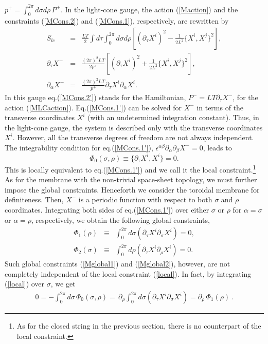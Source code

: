 \documentclass[12pt,a4paper]{article}
\newcommand{\ptau}{\partial_\tau}
\newcommand{\psig}{\partial_\sigma}
\newcommand{\prho}{\partial_\rho}
\newcommand{\p}{\partial}
\begin{document}
$p^{+}=\int_0^{2\pi}d\sigma d\rho\,P^{+}$.
In the light-cone gauge, the action (\ref{Maction}) and the constraints
(\ref{MCons.2}) and (\ref{MCons.1}), respectively, are rewritten by
\begin{eqnarray}
  S_{lc}&=&\frac{LT}{2}\int d\tau\int_0^{2\pi}d\sigma d\rho\left[
	(\ptau X^i)^2-\frac{1}{2L^2}\{X^{i},X^{j}\}^2\right]
	\label{MLCaction},\\
  \ptau X^{-}&=&\frac{(2\pi)^2 LT}{2p^+}\left[(\ptau X^i)^2
	+ \frac{1}{2L^2}\{X^{i},X^{j}\}^2\right]\label{MCons.2'},\\
  \p_{\alpha}X^{-}&=&\frac{(2\pi)^2 LT}{p^+} \ptau X^i\p_{\alpha}
	X^i\label{MCons.1'}.
\end{eqnarray}
In this gauge eq.(\ref{MCons.2'}) stands for the Hamiltonian,
$P^-=LT\ptau X^-$, for the action (\ref{MLCaction}).
Eq.(\ref{MCons.1'}) can be solved for $X^-$ in terms of the transverse
coordinates $X^i$ (with an undetermined integration constant). Thus,
in the light-cone gauge, the system is described only with the
transverse coordinates $X^i$. However, all the transverse degrees of
freedom are not always independent.
The integrability condition for eq.(\ref{MCons.1'}),
$\epsilon^{\alpha\beta}\p_\alpha\p_\beta X^-=0$, leads to
\begin{equation}
  \Phi_0(\sigma,\rho)\equiv\{\ptau X^i,X^i\}=0.\label{local}
\end{equation}
This is locally equivalent to eq.(\ref{MCons.1'}) and we call it the
local constraint.\footnote{As for the closed string in the previous
section, there is no counterpart of the local constraint.}
As for the membrane with the non-trivial space-sheet topology,
we must further impose the global constraints.
Henceforth we consider the toroidal membrane for definiteness.
Then, $X^-$ is a periodic function with respect to both $\sigma$ and
$\rho$ coordinates. Integrating both sides of
eq.(\ref{MCons.1'}) over either $\sigma$ or $\rho$  for
$\alpha=\sigma$ or $\alpha=\rho$, respectively, we obtain the
following global constraints,
\begin{eqnarray}
  \Phi_1(\rho)&\equiv&\int_0^{2\pi} d\sigma (\ptau X^i\psig X^i)
	=0,\label{Mglobal1}\\
  \Phi_2(\sigma)&\equiv&\int_0^{2\pi} d\rho (\ptau X^i\prho X^i)
	=0.\label{Mglobal2}
\end{eqnarray}
Such global constraints (\ref{Mglobal1}) and (\ref{Mglobal2}),
however, are not completely independent of the local constraint
(\ref{local}).
In fact, by integrating (\ref{local}) over $\sigma$, we get
\begin{eqnarray}
  0= -\int_0^{2\pi}d\sigma\, \Phi_0(\sigma,\rho)
    =\, \prho \int_0^{2\pi}d\sigma(\ptau X^i\psig X^i)
    =\prho\,\Phi_1(\rho)\,.
\end{eqnarray}
\end{document}

